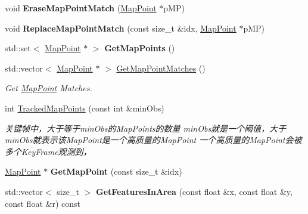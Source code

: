 \begin{DoxyCompactItemize}
\item 
\hypertarget{classORB__SLAM2_1_1KeyFrame_ab3a775e959978e6d449386882e45b8a2}{void {\bfseries Erase\-Map\-Point\-Match} (\hyperlink{classORB__SLAM2_1_1MapPoint}{Map\-Point} $\ast$p\-M\-P)}\label{classORB__SLAM2_1_1KeyFrame_ab3a775e959978e6d449386882e45b8a2}

\item 
\hypertarget{classORB__SLAM2_1_1KeyFrame_a35779a4eb4f5cec346780bbbdf377298}{void {\bfseries Replace\-Map\-Point\-Match} (const size\-\_\-t \&idx, \hyperlink{classORB__SLAM2_1_1MapPoint}{Map\-Point} $\ast$p\-M\-P)}\label{classORB__SLAM2_1_1KeyFrame_a35779a4eb4f5cec346780bbbdf377298}

\item 
\hypertarget{classORB__SLAM2_1_1KeyFrame_a09cb77a8377be3fa8c85c7b5ee45e913}{std\-::set$<$ \hyperlink{classORB__SLAM2_1_1MapPoint}{Map\-Point} $\ast$ $>$ {\bfseries Get\-Map\-Points} ()}\label{classORB__SLAM2_1_1KeyFrame_a09cb77a8377be3fa8c85c7b5ee45e913}

\item 
std\-::vector$<$ \hyperlink{classORB__SLAM2_1_1MapPoint}{Map\-Point} $\ast$ $>$ \hyperlink{classORB__SLAM2_1_1KeyFrame_aabc5f6491c32999d9f546669737547bf}{Get\-Map\-Point\-Matches} ()
\begin{DoxyCompactList}\small\item\em Get \hyperlink{classORB__SLAM2_1_1MapPoint}{Map\-Point} Matches. \end{DoxyCompactList}\item 
int \hyperlink{classORB__SLAM2_1_1KeyFrame_a729cbf2c84db5cbfdda98a9612f8cd0b}{Tracked\-Map\-Points} (const int \&min\-Obs)
\begin{DoxyCompactList}\small\item\em 关键帧中，大于等于min\-Obs的\-Map\-Points的数量 min\-Obs就是一个阈值，大于min\-Obs就表示该\-Map\-Point是一个高质量的\-Map\-Point 一个高质量的\-Map\-Point会被多个\-Key\-Frame观测到， \end{DoxyCompactList}\item 
\hypertarget{classORB__SLAM2_1_1KeyFrame_ab85915f3e647334634d8a4d489c63ffd}{\hyperlink{classORB__SLAM2_1_1MapPoint}{Map\-Point} $\ast$ {\bfseries Get\-Map\-Point} (const size\-\_\-t \&idx)}\label{classORB__SLAM2_1_1KeyFrame_ab85915f3e647334634d8a4d489c63ffd}

\item 
\hypertarget{classORB__SLAM2_1_1KeyFrame_a7175646cf4c30724b20bb4d30b83b0b3}{std\-::vector$<$ size\-\_\-t $>$ {\bfseries Get\-Features\-In\-Area} (const float \&x, const float \&y, const float \&r) const }\label{classORB__SLAM2_1_1KeyFrame_a7175646cf4c30724b20bb4d30b83b0b3}


\end{DoxyCompactItemize}

